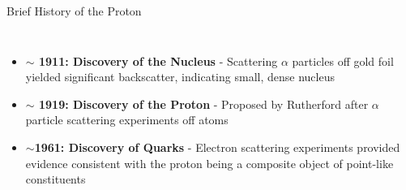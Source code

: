 \documentclass[aspectratio=169]{beamer}
\newcommand*{\myfont}{\fontfamily{lmtt}\selectfont}
\begin{document}


\begin{frame}{Brief History of the Proton}


   \begin{columns}
        
              \begin{itemize}
                    \setlength\itemsep{1em}
                    \item  \textbf{$\sim$ 1911: Discovery of the Nucleus} - Scattering $\alpha$ particles off gold foil yielded significant backscatter, indicating small, dense nucleus  {\myfont{\tiny  [Wikipedia:Geiger-Marsden]   }}
                    \item \textbf{$\sim$ 1919: Discovery of the Proton} - Proposed by Rutherford after $\alpha$ particle scattering experiments off atoms {\myfont{\tiny  [E. Rutherford doi:10.1080/14786431003659230]   }}
                    \item \textbf{$\sim$1961: Discovery of Quarks} - Electron scattering experiments provided evidence consistent with the proton being a composite object of point-like constituents 
                    \end{itemize}


\end{columns}
\end{frame}
\end{document}

